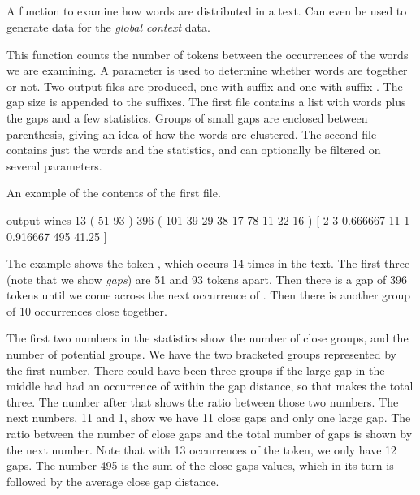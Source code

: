 \documentclass[a4paper,10pt,twoside]{report}
\begin{document}
\subsection{}

A function to examine how words are distributed in a text. Can even be
used to generate data for the \emph{global context} data.

This function counts the number of tokens between the occurrences of
the words we are examining. A  parameter is used to determine
whether words are  together or not. Two output files are
produced, one with suffix  and one with suffix . The
gap size is appended to the suffixes. The first file contains a list
with words plus the gaps and a few statistics. Groups of small gaps
are enclosed between parenthesis, giving an idea of how the words are
clustered. The second file contains just the words and the statistics,
and can optionally be filtered on several parameters.

An example of the contents of the first file.

\begin{wout}{ output}
wines 13 ( 51 93 ) 396 ( 101 39 29 38 17 78 11 22 16 ) 
                                  [ 2 3 0.666667 11 1 0.916667 495 41.25 ]
\end{wout}

The example shows the token , which occurs \num{14} times
in the text. The first three (note that we show \emph{gaps}) are
\num{51} and \num{93} tokens apart. Then there is a gap of \num{396}
tokens until we come across the next occurrence of . Then
there is another group of \num{10} occurrences close together.

The first two numbers in the statistics show the number of close
groups, and the number of potential groups. We have the two bracketed
groups represented by the first number. There could have been three
groups if the large gap in the middle had had an occurrence of
 within the gap distance, so that makes the total
three. The number after that shows the ratio between those two
numbers. The next numbers, \num{11} and \num{1}, show we have \num{11}
close gaps and only one large gap. The ratio between the number of
close gaps and the total number of gaps is shown by the next
number. Note that with \num{13} occurrences of the token, we only have
\num{12} gaps. The number \num{495} is the sum of the close gaps
values, which in its turn is followed by the average close gap
distance. 
\end{document}
